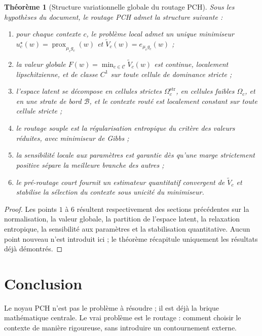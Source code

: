 \documentclass[11pt,a4paper]{article}
\newtheorem{theorem}{Théorème}[section]
\DeclareMathOperator{\prox}{prox}
\newcommand{\Ccal}{\mathcal C}
\newcommand{\Bcal}{\mathcal B}
\begin{document}
\begin{theorem}[Structure variationnelle globale du routage PCH]
Sous les hypothèses du document, le routage PCH admet la structure suivante :
\begin{enumerate}[leftmargin=2em]
\item pour chaque contexte \(c\), le problème local admet un unique minimiseur \(u_c^\star(w)=\prox_{\mu_c g_c}(w)\) et \(\widetilde V_c(w)=e_{\mu_c g_c}(w)\) ;
\item la valeur globale \(F(w)=\min_{c\in\Ccal}\widetilde V_c(w)\) est continue, localement lipschitzienne, et de classe \(C^1\) sur toute cellule de dominance stricte ;
\item l'espace latent se décompose en cellules strictes \(\Omega_c^{\mathrm{str}}\), en cellules faibles \(\Omega_c\), et en une strate de bord \(\Bcal\), et le contexte routé est localement constant sur toute cellule stricte ;
\item le routage souple est la régularisation entropique du critère des valeurs réduites, avec minimiseur de Gibbs ;
\item la sensibilité locale aux paramètres est garantie dès qu'une marge strictement positive sépare la meilleure branche des autres ;
\item le pré-routage court fournit un estimateur quantitatif convergent de \(\widetilde V_c\) et stabilise la sélection du contexte sous unicité du minimiseur.
\end{enumerate}
\end{theorem}

\begin{proof}
Les points \(1\) à \(6\) résultent respectivement des sections précédentes sur la normalisation, la valeur globale, la partition de l'espace latent, la relaxation entropique, la sensibilité aux paramètres et la stabilisation quantitative. Aucun point nouveau n'est introduit ici ; le théorème récapitule uniquement les résultats déjà démontrés.
\end{proof}

\section{Conclusion}

Le noyau PCH n'est pas le problème à résoudre ; il est déjà la brique mathématique centrale. Le vrai problème est le routage : comment choisir le contexte de manière rigoureuse, sans introduire un contournement externe.
\end{document}
